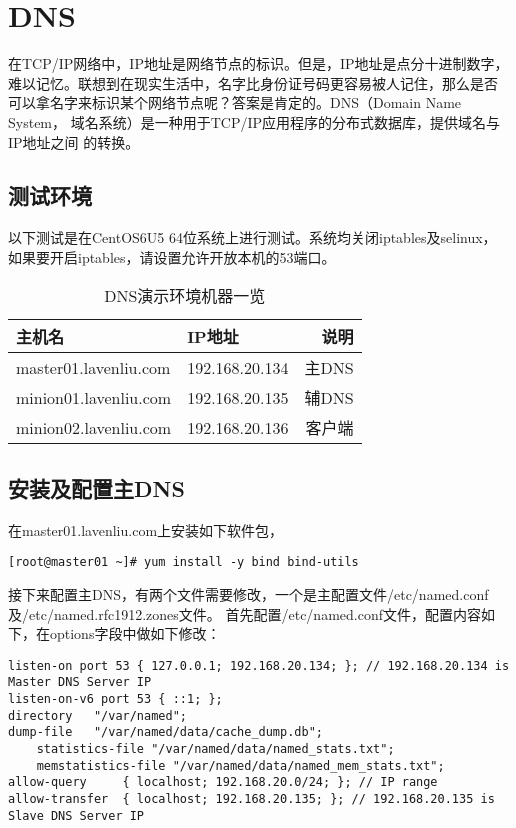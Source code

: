 \section{DNS}
\label{sec:dns}

在TCP/IP网络中，IP地址是网络节点的标识。但是，IP地址是点分十进制数字，
难以记忆。联想到在现实生活中，名字比身份证号码更容易被人记住，那么是否
可以拿名字来标识某个网络节点呢？答案是肯定的。DNS（Domain Name System，
域名系统）是一种用于TCP/IP应用程序的分布式数据库，提供域名与IP地址之间
的转换。

\subsection{测试环境}
\label{sec:dnsTestEnv}

以下测试是在CentOS6U5 64位系统上进行测试。系统均关闭iptables及selinux，
如果要开启iptables，请设置允许开放本机的53端口。

\begin{table}[htbp]
  \centering
    \caption{DNS演示环境机器一览}
    \label{tab:dnsMachines}
    \begin{tabular}{llr}
      \toprule
      主机名     & IP地址 & 说明 \\
      \midrule
      master01.lavenliu.com  & 192.168.20.134 &  主DNS \\
      minion01.lavenliu.com  & 192.168.20.135 &  辅DNS \\
      minion02.lavenliu.com  & 192.168.20.136 &  客户端 \\
      \bottomrule
    \end{tabular}
\end{table}

\subsection{安装及配置主DNS}
\label{sec:configMasterDNS}

在master01.lavenliu.com上安装如下软件包，

\begin{verbatim}
[root@master01 ~]# yum install -y bind bind-utils
\end{verbatim}

接下来配置主DNS，有两个文件需要修改，一个是主配置文件/etc/named.conf及/etc/named.rfc1912.zones文件。
首先配置/etc/named.conf文件，配置内容如下，在options字段中做如下修改：

\begin{verbatim}
listen-on port 53 { 127.0.0.1; 192.168.20.134; }; // 192.168.20.134 is Master DNS Server IP
listen-on-v6 port 53 { ::1; };
directory	"/var/named";
dump-file	"/var/named/data/cache_dump.db";
	statistics-file "/var/named/data/named_stats.txt";
	memstatistics-file "/var/named/data/named_mem_stats.txt";
allow-query		{ localhost; 192.168.20.0/24; }; // IP range
allow-transfer	{ localhost; 192.168.20.135; }; // 192.168.20.135 is Slave DNS Server IP
\end{verbatim}

